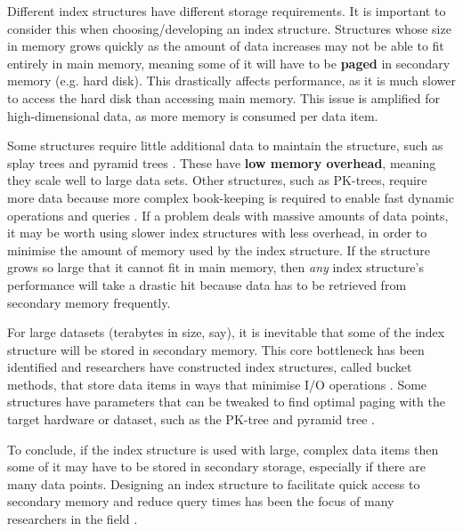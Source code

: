 Different index structures have different storage requirements. It is important to consider this when choosing/developing an index structure. Structures whose size in memory grows quickly as the amount of data increases may not be able to fit entirely in main memory, meaning some of it will have to be \textbf{paged} in secondary memory (e.g. hard disk). This drastically affects performance, as it is much slower to access the hard disk than accessing main memory. This issue is amplified for high-dimensional data, as more memory is consumed per data item.

Some structures require little additional data to maintain the structure, such as splay trees and pyramid trees \cite{splay-tree, pyramid-tree}. These have \textbf{low memory overhead}, meaning they scale well to large data sets. Other structures, such as PK-trees, require more data because more complex book-keeping is required to enable fast dynamic operations and queries \cite{pk-tree}. If a problem deals with massive amounts of data points, it may be worth using slower index structures with less overhead, in order to minimise the amount of memory used by the index structure. If the structure grows so large that it cannot fit in main memory, then \textit{any} index structure's performance will take a drastic hit because data has to be retrieved from secondary memory frequently.

For large datasets (terabytes in size, say), it is inevitable that some of the index structure will be stored in secondary memory. This core bottleneck has been identified and researchers have constructed index structures, called bucket methods, that store data items in ways that minimise I/O operations \cite{md-structures-samet}. Some structures have parameters that can be tweaked to find optimal paging with the target hardware or dataset, such as the PK-tree and pyramid tree \cite{pyramid-tree, pk-tree}.

To conclude, if the index structure is used with large, complex data items then some of it may have to be stored in secondary storage, especially if there are many data points. Designing an index structure to facilitate quick access to secondary memory and reduce query times has been the focus of many researchers in the field  \cite{rsr-tree, rs-tree}.
